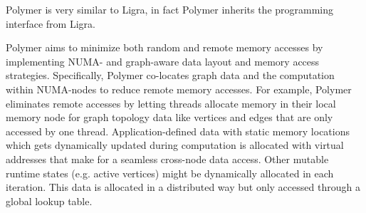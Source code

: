 
Polymer is very similar to Ligra, in fact Polymer inherits the programming interface from Ligra\cite{Polymer}.


Polymer aims to minimize both random and remote memory accesses by implementing NUMA- and graph-aware data layout and memory access strategies.
Specifically, Polymer co-locates graph data and the computation within NUMA-nodes to reduce remote memory accesses.
For example, Polymer eliminates remote accesses by letting threads allocate memory in their local memory node for graph topology data like vertices and edges that are only accessed by one thread.
Application-defined data with static memory locations which gets dynamically updated during computation is allocated with virtual addresses that make for a seamless cross-node data access.
Other mutable runtime states (e.g. active vertices) might be dynamically allocated in each iteration. This data is allocated in a distributed way but only accessed through a global lookup table.








